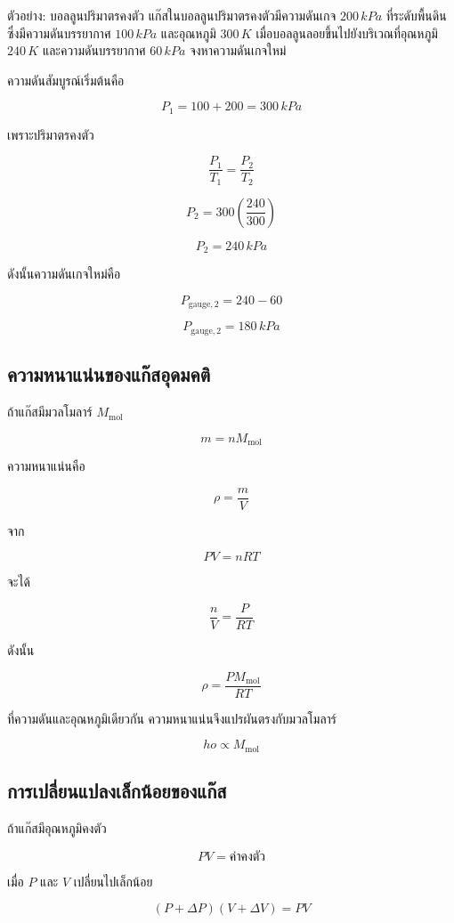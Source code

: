 \begin{examplebox}{ตัวอย่าง: บอลลูนปริมาตรคงตัว}
แก๊สในบอลลูนปริมาตรคงตัวมีความดันเกจ $200\,\si{kPa}$ ที่ระดับพื้นดิน ซึ่งมีความดันบรรยากาศ $100\,\si{kPa}$ และอุณหภูมิ $300\,\si{K}$ เมื่อบอลลูนลอยขึ้นไปยังบริเวณที่อุณหภูมิ $240\,\si{K}$ และความดันบรรยากาศ $60\,\si{kPa}$ จงหาความดันเกจใหม่

ความดันสัมบูรณ์เริ่มต้นคือ

\[
P_1=100+200=300\,\si{kPa}
\]

เพราะปริมาตรคงตัว

\[
\frac{P_1}{T_1}=\frac{P_2}{T_2}
\]

\[
P_2=300\left(\frac{240}{300}\right)
\]

\[
P_2=240\,\si{kPa}
\]

ดังนั้นความดันเกจใหม่คือ

\[
P_{\text{gauge},2}=240-60
\]

\[
\boxed{P_{\text{gauge},2}=180\,\si{kPa}}
\]
\end{examplebox}

\subsection{ความหนาแน่นของแก๊สอุดมคติ}

ถ้าแก๊สมีมวลโมลาร์ $M_{\text{mol}}$

\[
m=nM_{\text{mol}}
\]

ความหนาแน่นคือ

\[
\rho=\frac{m}{V}
\]

จาก

\[
PV=nRT
\]

จะได้

\[
\frac{n}{V}=\frac{P}{RT}
\]

ดังนั้น

\[
\boxed{
\rho
=
\frac{PM_{\text{mol}}}{RT}
}
\]

ที่ความดันและอุณหภูมิเดียวกัน ความหนาแน่นจึงแปรผันตรงกับมวลโมลาร์

\[
\boxed{
ho\propto M_{\text{mol}}}
\]

\subsection{การเปลี่ยนแปลงเล็กน้อยของแก๊ส}

ถ้าแก๊สมีอุณหภูมิคงตัว

\[
PV=\text{ค่าคงตัว}
\]

เมื่อ $P$ และ $V$ เปลี่ยนไปเล็กน้อย

\[
(P+\Delta P)(V+\Delta V)=PV
\]

